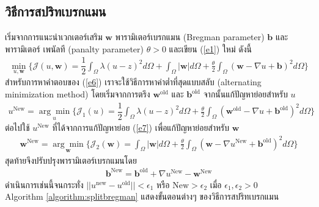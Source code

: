 \subsection{วิธีการสปริทเบรกแมน}

\hspace{1cm} เริ่มจากการแนะนำเวกเตอร์เสริม $\boldsymbol{w}$ พารามิเตอร์เบรกแมน (Bregman parameter) $\boldsymbol{b}$ และพารามิเตอร์ \break เพนัลที (panalty parameter) $\theta>0$ และเขียน (\ref{e1}) ใหม่ ดังนี้
\begin{align}
	\min_{u,\boldsymbol{w}} \{ \mathcal{J}(u,\boldsymbol{w}) = \dfrac{1}{2} \int_{\Omega} \lambda(u-z)^2 d\Omega +  \int_{\Omega}  | \boldsymbol{w}|  d\Omega + \frac{\theta}{2} \int_{\Omega} (\boldsymbol{w} - \nabla u + \boldsymbol{b})^{2} d\Omega \}
	\label{e6}
\end{align}
\hspace{1cm}สำหรับการหาคำตอบของ (\ref{e6}) เราจะใช้วิธีการหาค่าต่ำที่สุดแบบสลับ (alternating minimization method) โดยเริ่มจากการตรึง $\boldsymbol{w}^{\text{old}}$ และ $\boldsymbol{b}^{\text{old}}$ จากนั้นแก้ปัญหาย่อยสำหรับ $u$
\begin{align}
	u^{\text{New}}=\underset{u}{\arg\min} \{ \mathcal{J}_1(u) = \dfrac{1}{2} \int_{\Omega} \lambda(u-z)^2 d\Omega + \frac{\theta}{2} \int_{\Omega} (\boldsymbol{w}^{\text{old}} - \nabla u + \boldsymbol{b}^{\text{old}})^{2} d\Omega \}
	\label{e7}
\end{align}
ต่อไปใช้ $u^{\text{New}}$ ที่ได้จากการแก้ปัญหาย่อย (\ref{e7}) เพื่อแก้ปัญหาย่อยสำหรับ $\boldsymbol{w}$
\begin{align}
	\boldsymbol{w}^{\text{New}}=\underset{\boldsymbol{w}}{\arg\min} \{ \mathcal{J}_2(\boldsymbol{w}) = \int_{\Omega}  |\boldsymbol{w}|  d\Omega  + \frac{\theta}{2} \int_{\Omega} (\boldsymbol{w} - \nabla u^{\text{New}} + \boldsymbol{b}^{\text{old}})^{2} d\Omega \}
	\label{e8}
\end{align}
	สุดท้ายจึงปรับปรุงพารามิเตอร์เบรกแมนโดย 
\begin{align}
	\boldsymbol{b}^{\text{New}}=\boldsymbol{b}^{\text{old}}+\nabla u^{\text{New}}-\boldsymbol{w}^{\text{New}}
	\label{e9}
\end{align}
ดำเนินการเช่นนี้จนกระทั่ง $||u^{\text{new}}-u^{\text{old}}||< \epsilon_1$ หรือ $\text{New}>\epsilon_2$ เมื่อ $\epsilon_1,\epsilon_2>0$ \\ 
\vspace{0.5cm}
\hspace{1cm} Algorithm \ref{algorithm:splitbregman} แสดงขั้นตอนต่างๆ ของวิธีการสปริทเบรกแมน \\
\vspace{0.5cm}

\vspace{0.5cm}

